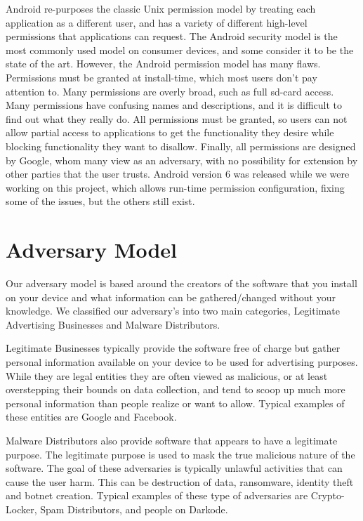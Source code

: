 Android re-purposes the classic Unix permission model by treating each application as a different user, and has a variety of different high-level permissions that applications can request.
The Android security model is the most commonly used model on consumer devices, and some consider it to be the state of the art.
However, the Android permission model has many flaws.
Permissions must be granted at install-time, which most users don't pay attention to.
Many permissions are overly broad, such as full sd-card access.
Many permissions have confusing names and descriptions, and it is difficult to find out what they really do.
All permissions must be granted, so users can not allow partial access to applications to get the functionality they desire while blocking functionality they want to disallow.
Finally, all permissions are designed by Google, whom many view as an adversary, with no possibility for extension by other parties that the user trusts.
Android version 6 was released while we were working on this project, which allows run-time permission configuration, fixing some of the issues, but the others still exist.

\section{Adversary Model}\label{section:adversary-model}
Our adversary model is based around the creators of the software that you install on your device and what information can be gathered/changed without your knowledge. We classified our adversary's into two main categories, Legitimate Advertising Businesses and Malware Distributors.

Legitimate Businesses typically provide the software free of charge but gather personal information available on your device to be used for advertising purposes.  While they are legal entities they are often viewed as malicious, or at least overstepping their bounds on data collection, and tend to scoop up much more personal information than people realize or want to allow. Typical examples of these entities are Google and Facebook.  

Malware Distributors also provide software that appears to have a legitimate purpose. The legitimate purpose is used to mask the true malicious nature of the software. The goal of these adversaries is typically unlawful activities that can cause the user harm. This can be destruction of data, ransomware, identity theft and botnet creation. Typical examples of these type of adversaries are Crypto-Locker, Spam Distributors, and people on Darkode.

